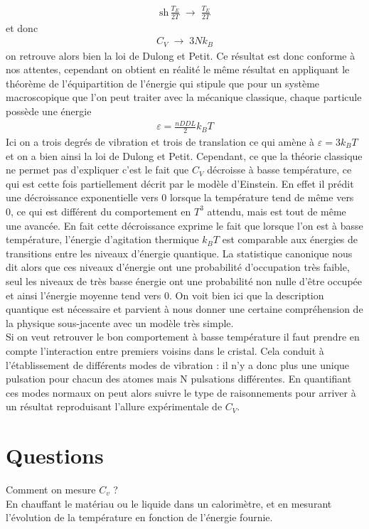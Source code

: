 \documentclass[12pt,prb,aps,epsf]{article}
\begin{document}
\begin{eqnarray}
\mathrm{sh}\,\frac{T_E}{2T} \;\longrightarrow \; \frac{T_E}{2T}
\end{eqnarray}
et donc  
\begin{eqnarray}
C_V \;\longrightarrow \; 3N k_B
\end{eqnarray}
on retrouve alors bien la loi de Dulong et Petit. Ce résultat est donc conforme à nos attentes, cependant on obtient en réalité le même résultat en appliquant le théorème de l'équipartition de l'énergie qui stipule que pour un système macroscopique que l'on peut traiter avec la mécanique classique, chaque particule possède une énergie 
\begin{eqnarray}
\varepsilon = \frac{nDDL}{2} k_B T
\end{eqnarray}
Ici on a trois degrés de vibration et trois de translation ce qui amène à $\varepsilon = 3k_BT$ et on a bien ainsi la loi de Dulong et Petit. Cependant, ce que la théorie classique ne permet pas d'expliquer c'est le fait que $C_V$ décroisse à basse température, ce qui est cette fois partiellement décrit par le modèle d'Einstein. En effet il prédit une décroissance exponentielle vers 0 lorsque la température tend de même vers 0, ce qui est différent du comportement en $T^3$ attendu, mais est tout de même une avancée. En fait cette décroissance exprime le fait que lorsque l'on est à basse température, l'énergie d'agitation thermique $k_BT$ est comparable aux énergies de transitions entre les niveaux d'énergie quantique. La statistique canonique nous dit alors que ces niveaux d'énergie ont une probabilité d'occupation très faible, seul les niveaux de très basse énergie ont une probabilité non nulle d'être occupée et ainsi l'énergie moyenne tend vers 0. On voit bien ici que la description quantique est nécessaire et parvient à nous donner une certaine compréhension de la physique sous-jacente avec un modèle très simple.\\

Si on veut retrouver le bon comportement à basse température il faut prendre en compte l'interaction entre premiers voisins dans le cristal. Cela conduit à l'établissement de différents modes de vibration : il n'y a donc plus une unique pulsation pour chacun des atomes mais N pulsations différentes. En quantifiant ces modes normaux on peut alors suivre le type de raisonnements pour arriver à un résultat reproduisant l'allure expérimentale de $C_V$.

\section*{Questions}
Comment on mesure $C_v$ ?\\
En chauffant le matériau ou le liquide dans un calorimètre, et en mesurant l'évolution de la température en fonction de l'énergie fournie.\\
\end{document}
